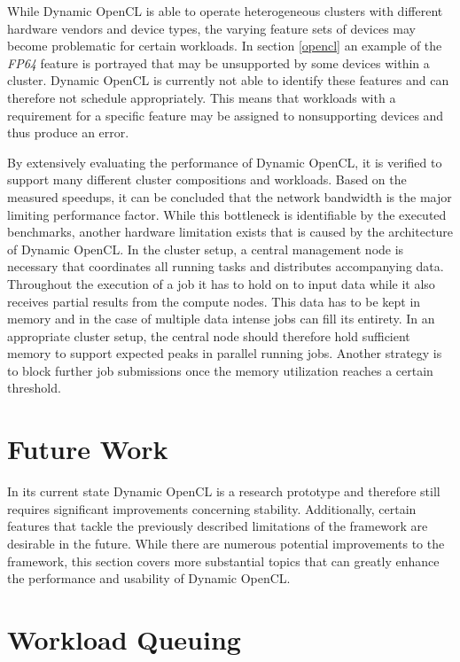 While Dynamic OpenCL is able to operate heterogeneous clusters with different hardware vendors and device types, the varying feature sets of devices may become problematic for certain workloads. In section \ref{opencl} an example of the \textit{FP64} feature is portrayed that may be unsupported by some devices within a cluster. Dynamic OpenCL is currently not able to identify these features and can therefore not schedule appropriately. This means that workloads with a requirement for a specific feature may be assigned to nonsupporting devices and thus produce an error.

By extensively evaluating the performance of Dynamic OpenCL, it is verified to support many different cluster compositions and workloads. Based on the measured speedups, it can be concluded that the network bandwidth is the major limiting performance factor. While this bottleneck is identifiable by the executed benchmarks, another hardware limitation exists that is caused by the architecture of Dynamic OpenCL. In the cluster setup, a central management node is necessary that coordinates all running tasks and distributes accompanying data. Throughout the execution of a job it has to hold on to input data while it also receives partial results from the compute nodes. This data has to be kept in memory and in the case of multiple data intense jobs can fill its entirety. In an appropriate cluster setup, the central node should therefore hold sufficient memory to support expected peaks in parallel running jobs. Another strategy is to block further job submissions once the memory utilization reaches a certain threshold.

\section{Future Work}
\label{future_work}
In its current state Dynamic OpenCL is a research prototype and therefore still requires significant improvements concerning stability. Additionally, certain features that tackle the previously described limitations of the framework are desirable in the future. While there are numerous potential improvements to the framework, this section covers more substantial topics that can greatly enhance the performance and usability of Dynamic OpenCL.

\section*{Workload Queuing}


